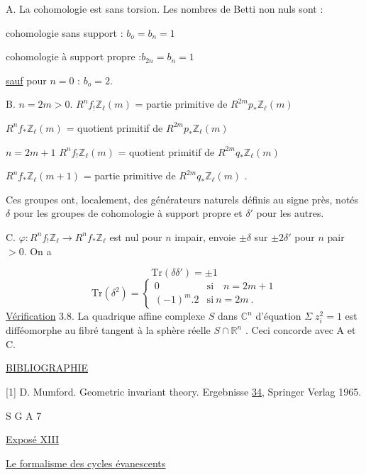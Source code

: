 A.  La cohomologie est sans torsion. Les nombres de Betti non nuls sont :

cohomologie sans support  :  $b_o = b_n = 1$

cohomologie à support propre :$b_{2n} = b_n = 1$

\underline{sauf} pour $n = 0$  :  $b_o = 2$.

B.  $n = 2m > 0$.  $R^n f_{!} \mathbb{Z}_\ell(m)$ = partie primitive de $R^{2m} p_{*} \mathbb{Z}_\ell(m)$

$R^n f_{*} \mathbb{Z}_\ell(m)$ = quotient primitif de $R^{2m} p_{*} \mathbb{Z}_\ell(m)$

$n = 2m + 1$   $R^n f_{!} \mathbb{Z}_\ell(m)$ = quotient primitif de $R^{2m} q_{*} \mathbb{Z}_\ell(m)$

$R^n f_{*} \mathbb{Z}_\ell(m+1)$ = partie primitive de $R^{2m} q_{*} \mathbb{Z}_\ell(m)$  .

Ces groupes ont, localement, des générateurs naturels définis au signe près, notés $\delta$ pour les groupes de cohomologie à support propre et $\delta'$ pour les autres.

C.  $\varphi : R^n f_{!} \mathbb{Z}_\ell \longrightarrow R^n f_{*} \mathbb{Z}_\ell$ est nul pour $n$ impair, envoie $\pm \delta$ sur $\pm 2 \delta'$ pour $n$ pair $> 0$. On a

\begin{equation*}
\mathrm{Tr}(\delta\delta') = \pm 1
\end{equation*}
\begin{equation*}
\mathrm{Tr}(\delta^2) = \begin{cases} 0 & \text{si} \quad n = 2m + 1 \\ (-1)^m . 2 & \text{si} \ n = 2m \ . \end{cases}
\end{equation*}
\underline{Vérification} 3.8.  La quadrique affine complexe $S$ dans $\mathbb{C}^n$ d'équation $\Sigma \; z_i^2 = 1$ est difféomorphe au fibré tangent à la sphère réelle $S \cap \mathbb{R}^n$ .  Ceci concorde avec A et C.

\underline{BIBLIOGRAPHIE}

{[}1]  D. Mumford.  Geometric invariant theory. Ergebnisse \underline{34}, Springer Verlag 1965.




S G A  7


\underline{Exposé XIII}


\underline{\underline{Le formalisme des cycles évanescents}}


